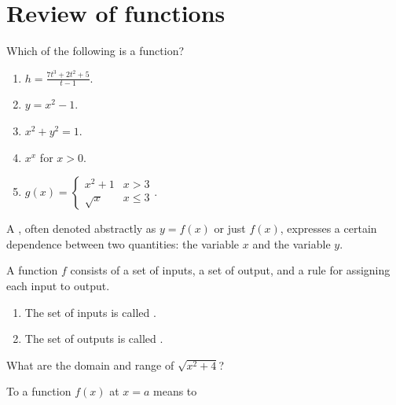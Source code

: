 \documentclass[../main.tex]{subfiles}
\begin{document}
 \section{Review of functions}
\begin{example}
  Which of the following is  a function?
  \begin{enumerate}[label=(\alph*)]
    \item \(h = \frac{7t^{3} + 2t^{2} + 5}{t - 1}\).
    \item \(y = x^{2} - 1\).
    \item \(x^{2} + y^{2} = 1\).
    \item \(x^{x}\) for \(x > 0\).
    \item \(g(x) = \begin{cases} x^{2} + 1 & x > 3\\ \sqrt{x} & x \le 3 \end{cases}\).
  \end{enumerate}
\end{example} 


A , often denoted abstractly as \(y = f(x)\) or just \(f(x)\), expresses a certain dependence between two quantities: the  variable \(x\) and the  variable \(y\).
\vspace{1em}

\begin{mdframed}[style=withref]
  A function \(f\) consists of a set of inputs, a set of output, and a rule for assigning each input to \underline{\hspace{2in}} output.
  \begin{enumerate}
    \item The set of inputs is called \underline{\hspace{1in}}.
    \item The set of outputs is called \underline{\hspace{1in}}.
  \end{enumerate}

\end{mdframed}


\begin{example}
  What are the domain and range of \(\sqrt{x^{2} + 4}\)?

\end{example}

To  a function \(f(x)\) at \(x = a\) means to \underline{\hspace{3in}}
\end{document}
